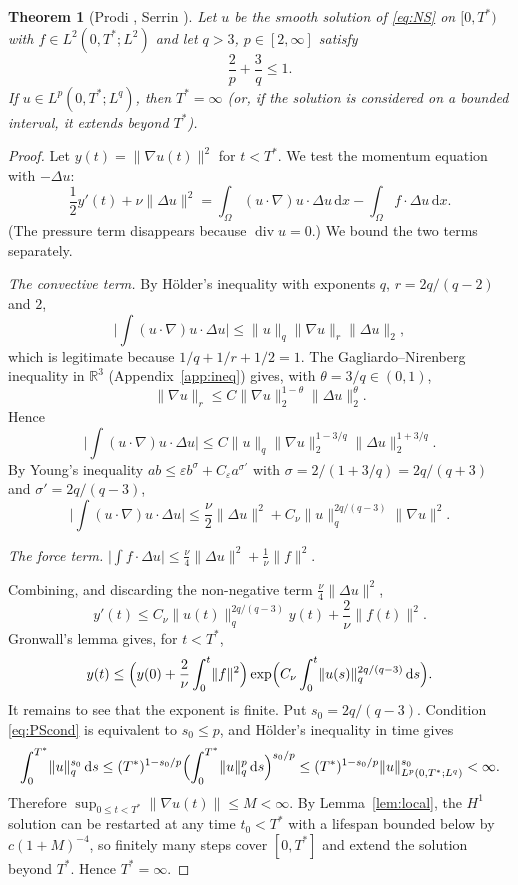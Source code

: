 \documentclass[11pt]{article}
\newtheorem{theorem}{Theorem}[section]
\theoremstyle{remark}
\newcommand{\R}{\mathbb{R}}
\newcommand{\eps}{\varepsilon}
\newcommand{\dd}{\,\mathrm{d}}
\newcommand{\norm}[1]{\lVert #1\rVert}
\newcommand{\abs}[1]{\lvert #1\rvert}
\newcommand{\Div}{\operatorname{div}}
\begin{document}
\begin{theorem}[Prodi \cite{Prodi1959}, Serrin \cite{Serrin1962}]\label{thm:PS}
Let $u$ be the smooth solution of \eqref{eq:NS} on $[0,T^*)$ with
$f\in L^2(0,T^*;L^2)$ and let $q>3$, $p\in[2,\infty]$ satisfy
\begin{equation}\label{eq:PScond}
\frac2p+\frac3q\le1 .
\end{equation}
If $u\in L^p(0,T^*;L^q)$, then $T^*=\infty$ (or, if the solution is considered on a bounded
interval, it extends beyond $T^*$).
\end{theorem}

\begin{proof}
Let $y(t)=\norm{\nabla u(t)}^2$ for $t<T^*$. We test the momentum equation with $-\Delta u$:
\[
\frac12y'(t)+\nu\norm{\Delta u}^2
=\int_\Omega(u\cdot\nabla)u\cdot\Delta u\dd x-\int_\Omega f\cdot\Delta u\dd x .
\]
(The pressure term disappears because $\Div u=0$.) We bound the two terms separately.

\emph{The convective term.} By H\"older's inequality with exponents $q$,
$r=2q/(q-2)$ and $2$,
\[
\abs{\int(u\cdot\nabla)u\cdot\Delta u}
\le\norm{u}_{q}\norm{\nabla u}_{r}\norm{\Delta u}_{2},
\]
which is legitimate because $1/q+1/r+1/2=1$. The Gagliardo--Nirenberg inequality in
$\R^3$ (Appendix~\ref{app:ineq}) gives, with $\theta=3/q\in(0,1)$,
\[
\norm{\nabla u}_{r}\le C\norm{\nabla u}_{2}^{1-\theta}\norm{\Delta u}_{2}^{\theta}.
\]
Hence
\[
\abs{\int(u\cdot\nabla)u\cdot\Delta u}
\le C\norm{u}_{q}\norm{\nabla u}_{2}^{1-3/q}\norm{\Delta u}_{2}^{1+3/q}.
\]
By Young's inequality $ab\le\eps b^{\sigma}+C_\eps a^{\sigma'}$ with
$\sigma=2/(1+3/q)=2q/(q+3)$ and $\sigma'=2q/(q-3)$,
\[
\abs{\int(u\cdot\nabla)u\cdot\Delta u}
\le\frac{\nu}{2}\norm{\Delta u}^2
+C_\nu\norm{u}_{q}^{2q/(q-3)}\norm{\nabla u}^2 .
\]

\emph{The force term.} $\abs{\int f\cdot\Delta u}\le\frac{\nu}{4}\norm{\Delta u}^2
+\frac1\nu\norm{f}^2$.

Combining, and discarding the non-negative term $\frac{\nu}{4}\norm{\Delta u}^2$,
\begin{equation}\label{eq:PSode}
y'(t)\le C_\nu\norm{u(t)}_{q}^{2q/(q-3)}y(t)+\frac{2}{\nu}\norm{f(t)}^2 .
\end{equation}
Gronwall's lemma gives, for $t<T^*$,
\begin{equation}\label{eq:PSgronwall}
y(t)\le\Bigl(y(0)+\frac2\nu\int_0^t\norm{f}^2\Bigr)
\exp\Bigl(C_\nu\int_0^t\norm{u(s)}_{q}^{2q/(q-3)}\dd s\Bigr).
\end{equation}
It remains to see that the exponent is finite. Put $s_0=2q/(q-3)$. Condition
\eqref{eq:PScond} is equivalent to $s_0\le p$, and H\"older's inequality in time gives
\[
\int_0^{T^*}\norm{u}_{q}^{s_0}\dd s
\le(T^*)^{1-s_0/p}\Bigl(\int_0^{T^*}\norm{u}_{q}^{p}\dd s\Bigr)^{s_0/p}
\le(T^*)^{1-s_0/p}\norm{u}_{L^p(0,T^*;L^q)}^{s_0}<\infty .
\]
Therefore $\sup_{0\le t<T^*}\norm{\nabla u(t)}\le M<\infty$. By
Lemma~\ref{lem:local}, the $H^1$ solution can be restarted at any time $t_0<T^*$ with a
lifespan bounded below by $c(1+M)^{-4}$, so finitely many steps cover $[0,T^*]$ and extend
the solution beyond $T^*$. Hence $T^*=\infty$.
\end{proof}
\end{document}
